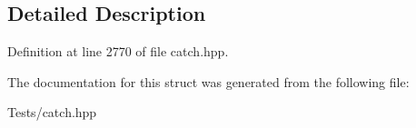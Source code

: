 \subsection{Detailed Description}


Definition at line 2770 of file catch.\+hpp.



The documentation for this struct was generated from the following file\+:\begin{DoxyCompactItemize}
\item 
Tests/catch.\+hpp\end{DoxyCompactItemize}
